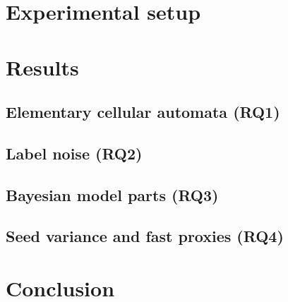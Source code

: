 \documentclass{article}
\begin{document}
\section{Experimental setup}

\section{Results}
\subsection{Elementary cellular automata (RQ1)}
\subsection{Label noise (RQ2)}
\subsection{Bayesian model parts (RQ3)}
\subsection{Seed variance and fast proxies (RQ4)}

\section{Conclusion}




\end{document}
